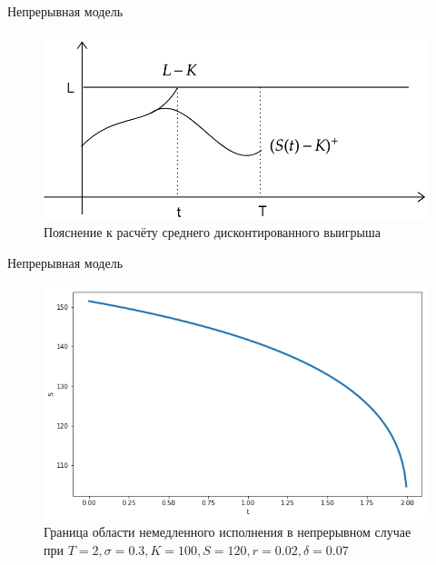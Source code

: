 \documentclass[12pt]{beamer}
\begin{document}
\begin{frame}{Непрерывная модель}
        \begin{figure}[h]
        \centering
        \includegraphics[scale=0.35]{Graphh1.png}
        \caption{Пояснение к расчёту среднего дисконтированного выигрыша}
        \label{demonstration}
    \end{figure}
\end{frame}

\begin{frame}{Непрерывная модель}
    \begin{figure}[h]
        \centering
        \includegraphics[scale=0.4]{Continuous.png}
        \caption{Граница области немедленного исполнения в непрерывном случае при $T=2, \sigma=0.3, K=100, S=120, r=0.02, \delta=0.07$}
        \label{continuous}
    \end{figure} 
\end{frame}
\end{document}
